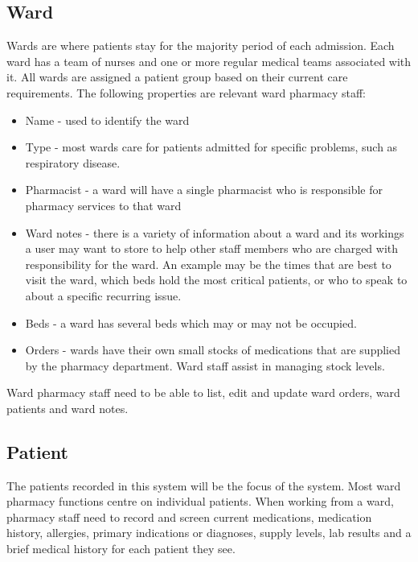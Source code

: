 \documentclass[letterpaper]{amsart}
\begin{document}
\subsection{Ward}
Wards are where patients stay for the majority period of each admission.  Each ward has a team of nurses and one or more regular medical teams associated with it.  All wards are assigned a patient group based on their current care requirements.
The following properties are relevant ward pharmacy staff:
\begin{itemize}
    \item Name - used to identify the ward
    \item Type - most wards care for patients admitted for specific problems, such as respiratory disease. 
    \item Pharmacist - a ward will have a single pharmacist who is responsible for pharmacy services to that ward 
    \item Ward notes - there is a variety of information about a ward and its workings a user may want to store to help other staff members who are charged with responsibility for the ward.  An example may be the times that are best to visit the ward, which beds hold the most critical patients, or who to speak to about a specific recurring issue. 
    \item Beds - a ward has several beds which may or may not be occupied. 
    \item Orders - wards have their own small stocks of medications that are supplied by the pharmacy department.  Ward staff assist in managing stock levels.
\end{itemize}
Ward pharmacy staff need to be able to list, edit and update ward orders, ward patients and ward notes. 
\subsection{Patient} The patients recorded in this system will be the focus of the system.  Most ward pharmacy functions centre on individual patients.  When working from a ward, pharmacy staff need to record and screen current medications, medication history, allergies, primary indications or diagnoses, supply levels, lab results and a brief medical history for each patient they see.
\end{document}

